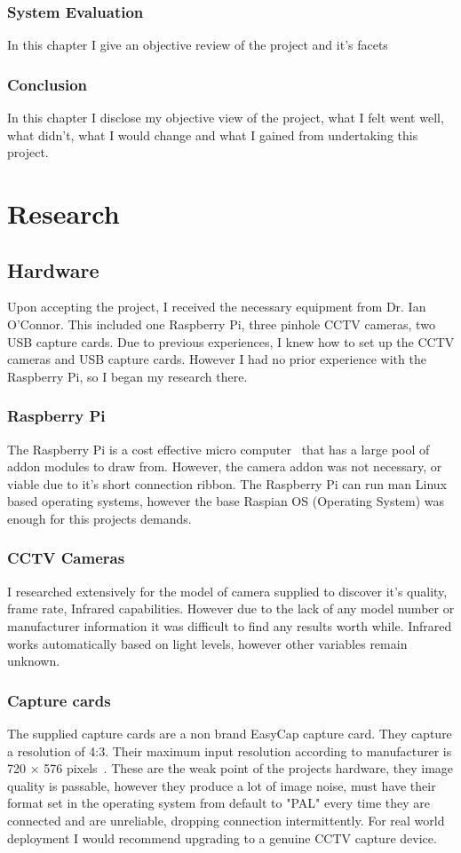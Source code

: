 \subsection{System Evaluation}
In this chapter I give an objective review of the project and it's facets
\subsection{Conclusion}
In this chapter I disclose my objective view of the project, what I felt went well, what didn't, what I would change and what I gained from undertaking this project.

\chapter{Research}
\section{Hardware}
Upon accepting the project, I received the necessary equipment from Dr. Ian O'Connor. This included one Raspberry Pi, three pinhole CCTV cameras, two USB capture cards. Due to previous experiences, I knew how to set up the CCTV cameras and USB capture cards. However I had no prior experience with the Raspberry Pi, so I began my research there. 
\subsection{Raspberry Pi}
The Raspberry Pi is a cost effective micro computer~\cite{raspWhat} that has a large pool of addon modules to draw from. However, the camera addon was not necessary, or viable due to it's short connection ribbon. The Raspberry Pi can run man Linux based operating systems, however the base Raspian OS (Operating System) was enough for this projects demands.
\subsection{CCTV Cameras}
I researched extensively for the model of camera supplied to discover it's quality, frame rate, Infrared capabilities. However due to the lack of any model number or manufacturer information it was difficult to find any results worth while. Infrared works automatically based on light levels, however other variables remain unknown.
\subsection{Capture cards}
The supplied capture cards are a non brand EasyCap capture card. They capture a resolution of 4:3. Their maximum input resolution according to manufacturer is 720 × 576 pixels~\cite{easyCap}. These are the weak point of the projects hardware, they image quality is passable, however they produce a lot of image noise, must have their format set in the operating system from default to "PAL" every time they are connected and are unreliable, dropping connection intermittently. For real world deployment I would recommend upgrading to a genuine CCTV capture device.
